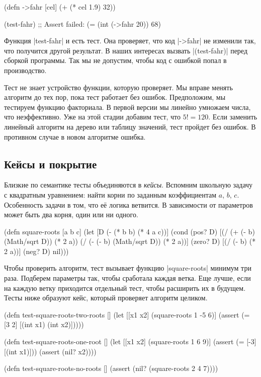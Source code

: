\begin{english}
  \begin{clojure}
(defn ->fahr [cel]
  (+ (* cel 1.9) 32))

(test-fahr)
;; Assert failed: (= (int (->fahr 20)) 68)
  \end{clojure}
\end{english}

Функция \spverb|test-fahr| и есть тест. Она проверяет, что код \spverb|->fahr|
не изменили так, что получится другой результат. В наших интересах вызвать
\spverb|(test-fahr)| перед сборкой программы. Так мы не допустим, чтобы код с
ошибкой попал в производство.

Тест не знает устройство функции, которую проверяет. Мы вправе менять алгоритм
до тех пор, пока тест работает без ошибок. Предположим, мы тестируем функцию
факториала. В первой версии мы линейно умножаем числа, что неэффективно. Уже на
этой стадии добавим тест, что $5! = 120$. Если заменить линейный алгоритм на
дерево или таблицу значений, тест пройдет без ошибок. В противном случае в новом
алгоритме ошибка.

\subsection{Кейсы и покрытие}

Близкие по семантике тесты объединяются в \emph{кейсы}. Вспомним школьную задачу
с квадратным уравнением: найти корни по заданным коэффициентам $a$, $b$,
$c$. Особенность задачи в том, что е\"{е} логика ветвится. В зависимости от
параметров может быть два корня, один или ни одного.

\begin{english}
  \begin{clojure}
(defn square-roots [a b c]
  (let [D (- (* b b) (* 4 a c))]
    (cond
      (pos? D) [(/ (+ (- b) (Math/sqrt D)) (* 2 a))
                (/ (- (- b) (Math/sqrt D)) (* 2 a))]
      (zero? D) [(/ (- b) (* 2 a))]
      (neg? D) nil)))
  \end{clojure}
\end{english}

Чтобы проверить алгоритм, тест вызывает функцию \spverb|square-roots| минимум
три раза. Подберем параметры так, чтобы сработала каждая ветка. Еще лучше, если
на каждую ветку приходится отдельный тест, чтобы расширить их в будущем. Тесты
ниже образуют кейс, который проверяет алгоритм целиком.

\begin{english}
  \begin{clojure}
(defn test-square-roots-two-roots []
  (let [[x1 x2] (square-roots 1 -5 6)]
    (assert (= [3 2] [(int x1) (int x2)]))))

(defn test-square-roots-one-root []
  (let [[x1 x2] (square-roots 1 6 9)]
    (assert (= [-3] [(int x1)]))
    (assert (nil? x2))))

(defn test-square-roots-no-roots []
  (assert (nil? (square-roots 2 4 7))))
  \end{clojure}
\end{english}

